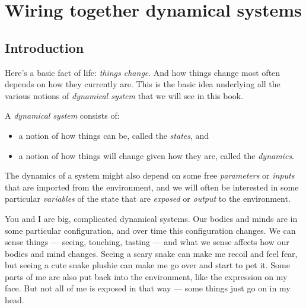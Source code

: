 \documentclass[DynamicalBook]{subfiles}
\begin{document}
%




\setcounter{chapter}{0}%


\chapter{Wiring together dynamical systems}\label{chapter.1}

\section{Introduction}\label{sec.chap1_intro}

Here's a basic fact of life: \emph{things change}. And how things change most
often depends on how they currently are. This is the basic idea underlying all the various notions of \emph{dynamical
  system} that we will see in this book.

\begin{informal}\label{inf.dynam_sys}
  A \emph{dynamical system} consists of:
  \begin{itemize}
  \item a notion of how things can be, called the \emph{states}, and
  \item a notion of how things will change given how they are, called the \emph{dynamics}.
  \end{itemize}
  The dynamics of a system might also depend on some free \emph{parameters} or \emph{inputs} that are imported from the environment, and
  we will often be interested in some particular \emph{variables} of the
  state that are \emph{exposed} or \emph{output} to the environment. 
\end{informal}

You and I are big, complicated dynamical systems. Our bodies and minds are in
some particular configuration, and over time this configuration changes. We can
sense things --- seeing, touching, tasting --- and what we sense affects how our
bodies and mind changes. Seeing a scary snake can make me recoil and feel fear,
but seeing a cute snake plushie can make me go over and start to pet it.
Some parts of me are also put back into the environment, like the expression on
my face. But not all of me is exposed in that way --- some things just go on in
my head.
\end{document}
